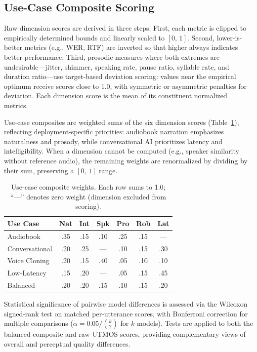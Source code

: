 \subsection{Use-Case Composite Scoring}

Raw dimension scores are derived in three steps. First, each metric is
clipped to empirically determined bounds and linearly scaled to $[0,\,1]$.
Second, lower-is-better metrics (e.g., WER, RTF) are inverted so that
higher always indicates better performance. Third, prosodic measures where
both extremes are undesirable---jitter, shimmer, speaking rate, pause
ratio, syllable rate, and duration ratio---use target-based deviation
scoring: values near the empirical optimum receive scores close to 1.0,
with symmetric or asymmetric penalties for deviation. Each dimension score
is the mean of its constituent normalized metrics.

Use-case composites are weighted sums of the six dimension scores
(Table~\ref{tab:composites}), reflecting deployment-specific priorities:
audiobook narration emphasizes naturalness and prosody, while conversational
AI prioritizes latency and intelligibility. When a dimension cannot be
computed (e.g., speaker similarity without reference audio), the remaining
weights are renormalized by dividing by their sum, preserving a $[0,\,1]$
range.

\begin{table}[t]
\centering
\caption{Use-case composite weights. Each row sums to 1.0; ``---'' denotes
zero weight (dimension excluded from scoring).}
\label{tab:composites}
\small
\begin{tabular}{@{}lcccccc@{}}
\toprule
\textbf{Use Case} & \textbf{Nat} & \textbf{Int} & \textbf{Spk} & \textbf{Pro} & \textbf{Rob} & \textbf{Lat} \\
\midrule
Audiobook      & .35 & .15 & .10 & .25 & .15 & --- \\
Conversational & .20 & .25 & --- & .10 & .15 & .30 \\
Voice Cloning  & .20 & .15 & .40 & .05 & .10 & .10 \\
Low-Latency    & .15 & .20 & --- & .05 & .15 & .45 \\
Balanced       & .20 & .20 & .15 & .10 & .15 & .20 \\
\bottomrule
\end{tabular}
\end{table}

Statistical significance of pairwise model differences is assessed via the
Wilcoxon signed-rank test on matched per-utterance scores, with Bonferroni
correction for multiple comparisons ($\alpha = 0.05 / \binom{k}{2}$ for $k$
models). Tests are applied to both the balanced composite and raw UTMOS
scores, providing complementary views of overall and perceptual quality
differences.
